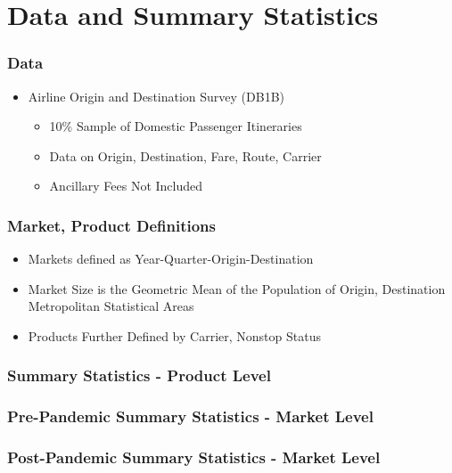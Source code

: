 \documentclass[xcolor=dvipsnames]{beamer}
\begin{document}
    \section{Data and Summary Statistics}

    \begin{frame}
		\frametitle{Data}
		\begin{itemize}
			\item Airline Origin and Destination Survey (DB1B)
			\begin{itemize}
				\item 10\% Sample of Domestic Passenger Itineraries 
				\item Data on Origin, Destination, Fare, Route, Carrier
                \item Ancillary Fees Not Included 
			\end{itemize}
		\end{itemize}
	\end{frame}


    \begin{frame}
        \frametitle{Market, Product Definitions}
        \begin{itemize}
        	\item Markets defined as Year-Quarter-Origin-Destination 
			\item Market Size is the Geometric Mean of the Population of Origin, Destination Metropolitan Statistical Areas
			\item Products Further Defined by Carrier, Nonstop Status
        \end{itemize}
    \end{frame}

      \begin{frame}
        \frametitle{Summary Statistics - Product Level}
            \resizebox{0.8\linewidth}{!}{%

}
    \end{frame}

    \begin{frame}
        \frametitle{Pre-Pandemic Summary Statistics - Market Level}
        \centering
        \begin{adjustbox}{max height=\dimexpr\textheight-5.5cm\relax,
           max width=\textwidth}

\end{adjustbox}
    \end{frame}

     \begin{frame}
        \frametitle{Post-Pandemic Summary Statistics - Market Level}
        \centering
        \begin{adjustbox}{max height=\dimexpr\textheight-5.5cm\relax,
           max width=\textwidth}

\end{adjustbox}
    \end{frame}
\end{document}
